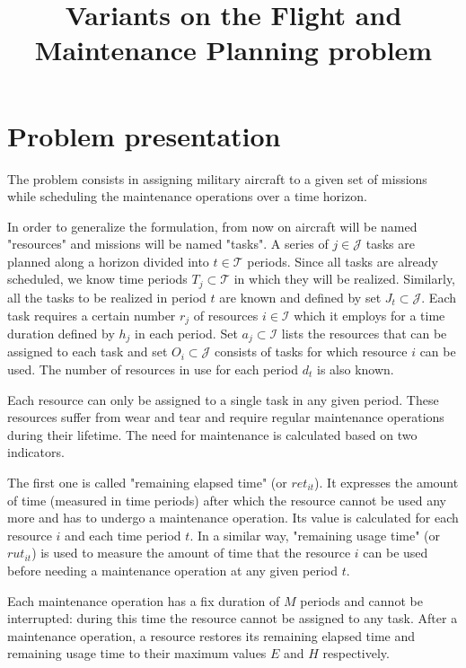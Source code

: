 \documentclass[a4paper,11pt]{article}
\title{Variants on the Flight and Maintenance Planning problem}
\author{}
\begin{document}
\maketitle


\section{Problem presentation}

    The problem consists in assigning military aircraft to a given set of missions while scheduling the maintenance operations over a time horizon.

    In order to generalize the formulation, from now on aircraft will be named "resources" and missions will be named "tasks". A series of $j \in \mathcal{J}$ tasks are planned along a horizon divided into $t \in \mathcal{T}$ periods. Since all tasks are already scheduled, we know time periods $T_j \subset \mathcal{T}$ in which they will be realized. Similarly, all the tasks to be realized in period $t$ are known and defined by set $J_t \subset \mathcal{J}$. Each task requires a certain number $r_{j}$ of resources $i \in \mathcal{I}$ which it employs for a time duration defined by $h_j$ in each period. Set $a_{j} \subset \mathcal{I}$ lists the resources that can be assigned to each task and set $O_i \subset \mathcal{J}$ consists of tasks for which resource $i$ can be used. The number of resources in use for each period $d_t$ is also known.

    Each resource can only be assigned to a single task in any given period. These resources suffer from wear and tear and require regular maintenance operations during their lifetime. The need for maintenance is calculated based on two indicators.

    The first one is called "remaining elapsed time" (or $ret_{it}$). It expresses the amount of time (measured in time periods) after which the resource cannot be used any more and has to undergo a maintenance operation. Its value is calculated for each resource $i$ and each time period $t$. In a similar way, "remaining usage time" (or $rut_{it}$) is used to measure the amount of time that the resource $i$ can be used before needing a maintenance operation at any given period $t$.

    Each maintenance operation has a fix duration of $M$ periods and cannot be interrupted: during this time the resource cannot be assigned to any task. After a maintenance operation, a resource restores its remaining elapsed time and remaining usage time to their maximum values $E$ and $H$ respectively.
\end{document}
